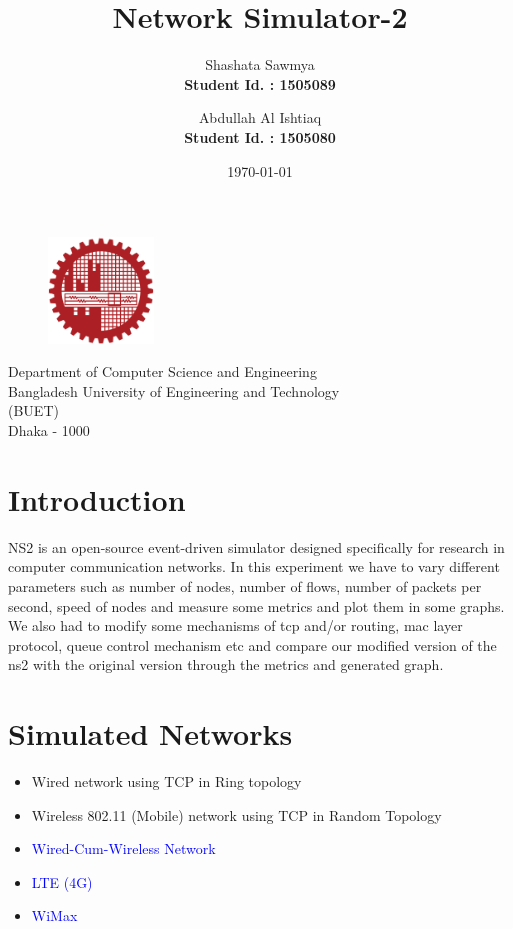 \documentclass{article}[12pt]
\title{\Huge{Network Simulator-2}}
\author{Shashata Sawmya \\
        \textbf{Student Id. : 1505089} 
        \and 
        Abdullah Al Ishtiaq \\
        \textbf{Student Id. : 1505080}}
\date{\today}
\begin{document}
\maketitle

\vspace{4cm}

\begin{figure}[h!]
\centering
    \includegraphics[width = 0.25\textwidth]{Pictures/logoBUET.png}
\end{figure}
\begin{center}
\vspace{.5cm}

\Large{Department of Computer Science and Engineering \\
    Bangladesh University of Engineering and Technology \\
    (BUET) \\
    Dhaka - 1000 }

\end{center}
\newpage

\tableofcontents
\newpage

\listoffigures
\newpage

\section{Introduction}
    NS2 is an open-source event-driven simulator designed specifically for research in computer communication networks. In this experiment we have to vary different parameters such as number of nodes, number of flows, number of packets per second, speed of nodes and measure some metrics and plot them in some graphs. 
    We also had to modify some mechanisms of tcp and/or routing, mac layer protocol, queue control mechanism etc and compare our modified version of the ns2 with the original version through the metrics and generated graph.
    
\section{Simulated Networks}
\begin{itemize}
    \item Wired network using TCP in Ring topology
    \item Wireless 802.11 (Mobile) network using TCP in Random Topology
    \item \textcolor{blue}{Wired-Cum-Wireless Network}
    \item \textcolor{blue}{LTE (4G)}
    \item \textcolor{blue}{WiMax}
\end{itemize}
    
\end{document}
